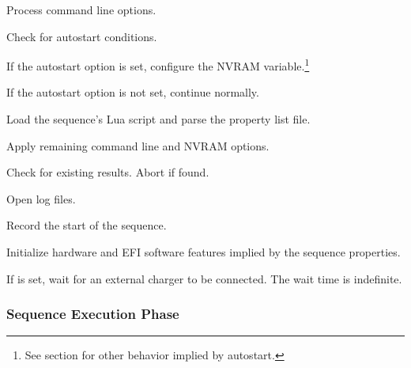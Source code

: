 \begin{Process}

	\item Process command line options.

	\item Check for autostart conditions.

	\begin{Process}

		\item If the autostart option is set, configure the
		 NVRAM variable.\footnote{See section
		 for other behavior implied by
		autostart.}
		
		\item If the autostart option is not set, continue normally.

	\end{Process}

	\item Load the sequence's Lua script and parse the property list file.

	\item Apply remaining command line and NVRAM options.

	\item Check for existing results.  Abort if found.

	\item Open log files.

	\item Record the start of the sequence.

	\item Initialize hardware and EFI software features implied by the
	sequence properties.

	\item If  is set, wait for an external charger to
	be connected.  The wait time is indefinite.

\end{Process}

\subsubsection{Sequence Execution Phase}

